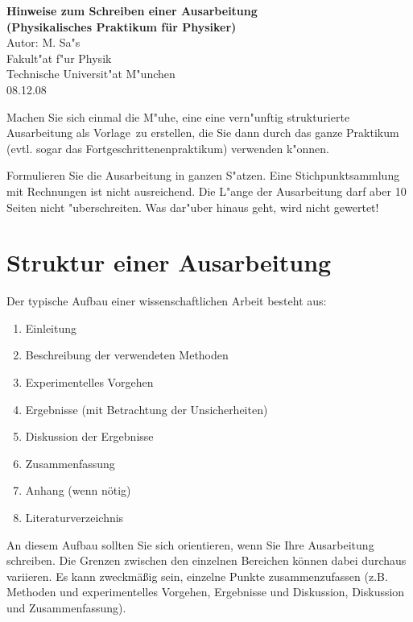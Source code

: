 \documentclass[a4paper,11pt]{article}
\newcommand{\stand}{08.12.08}
\begin{document}
\begin{center}
\textbf{\Large Hinweise zum Schreiben einer Ausarbeitung}\\[1ex]
\textbf{\large (Physikalisches Praktikum f\"ur Physiker)}\\[5ex]
       Autor: M. Sa"s\\
       Fakult"at f"ur Physik\\
       Technische Universit"at M"unchen\\[1ex]
       \stand
\end{center}

\tableofcontents
\clearpage

Machen Sie sich einmal die M"uhe, eine eine vern"unftig strukturierte Ausarbeitung als 
\glqq Vorlage\grqq\ zu erstellen, die Sie dann durch das ganze Praktikum (evtl. sogar
das Fortgeschrittenenpraktikum) verwenden k"onnen.

Formulieren Sie die Ausarbeitung in ganzen S"atzen. Eine Stichpunktsammlung
mit Rechnungen ist nicht ausreichend. Die L"ange der Ausarbeitung darf aber 10 
Seiten nicht "uberschreiten. 
Was dar"uber hinaus geht, wird nicht gewertet!

\section{Struktur einer Ausarbeitung}\label{sec:struktur}
Der typische Aufbau einer wissenschaftlichen Arbeit besteht aus:
\begin{enumerate}
\item Einleitung\\[-1.7em] %
\item Beschreibung der verwendeten Methoden\\[-1.7em]
\item Experimentelles Vorgehen\\[-1.7em]
\item Ergebnisse (mit Betrachtung der Unsicherheiten)\\[-1.7em]
\item Diskussion der Ergebnisse\\[-1.7em]
\item Zusammenfassung\\[-1.7em]
\item Anhang (wenn nötig)\\[-1.7em]
\item Literaturverzeichnis\\
\end{enumerate}
An diesem Aufbau sollten Sie sich orientieren, wenn Sie Ihre Ausarbeitung
schreiben. Die Grenzen zwischen den einzelnen Bereichen können dabei
durchaus variieren. Es kann zweckmäßig sein, einzelne Punkte zusammenzufassen
(z.B. Methoden und experimentelles Vorgehen, Ergebnisse und Diskussion,
Diskussion und Zusammenfassung).
\end{document}
